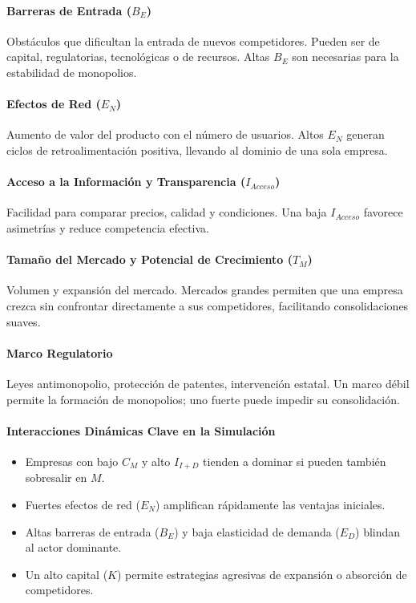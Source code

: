 \documentclass[a4paper,12pt]{article}
\begin{document}
\begin{itemize}
    \paragraph{Barreras de Entrada ($B_E$)} Obstáculos que dificultan la entrada de nuevos competidores. Pueden ser de capital, regulatorias, tecnológicas o de recursos. Altas $B_E$ son necesarias para la estabilidad de monopolios.

    \paragraph{Efectos de Red ($E_N$)} Aumento de valor del producto con el número de usuarios. Altos $E_N$ generan ciclos de retroalimentación positiva, llevando al dominio de una sola empresa.

    \paragraph{Acceso a la Información y Transparencia ($I_{Acceso}$)} Facilidad para comparar precios, calidad y condiciones. Una baja $I_{Acceso}$ favorece asimetrías y reduce competencia efectiva.

    \paragraph{Tamaño del Mercado y Potencial de Crecimiento ($T_M$)} Volumen y expansión del mercado. Mercados grandes permiten que una empresa crezca sin confrontar directamente a sus competidores, facilitando consolidaciones suaves.

    \paragraph{Marco Regulatorio} Leyes antimonopolio, protección de patentes, intervención estatal. Un marco débil permite la formación de monopolios; uno fuerte puede impedir su consolidación.

\end{itemize}

\paragraph{Interacciones Dinámicas Clave en la Simulación}

\begin{itemize}
    \item Empresas con bajo $C_M$ y alto $I_{I+D}$ tienden a dominar si pueden también sobresalir en $M$.
    \item Fuertes efectos de red ($E_N$) amplifican rápidamente las ventajas iniciales.
    \item Altas barreras de entrada ($B_E$) y baja elasticidad de demanda ($E_D$) blindan al actor dominante.
    \item Un alto capital ($K$) permite estrategias agresivas de expansión o absorción de competidores.

\end{itemize}
\end{document}
